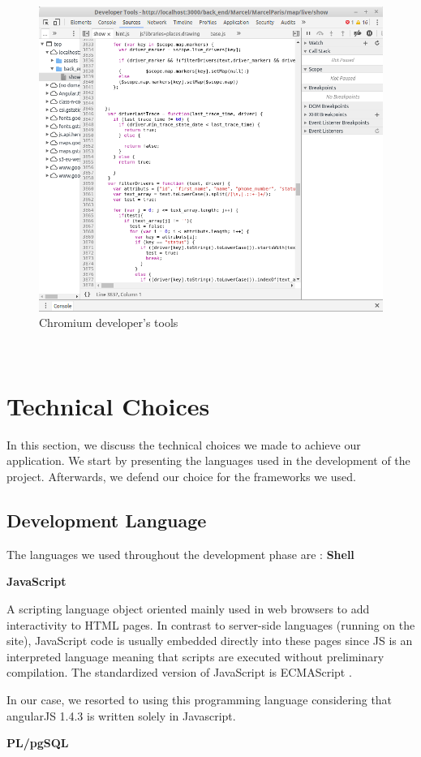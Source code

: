 \begin{itemize}[label=]
\begin{figure}[!htpb] 
\begin{center}
\includegraphics[width=6 in, height = 2 in]{images/chrome.png}
\caption{Chromium developer’s tools}
\label{chrome_dev}
\end{center}
\end{figure}~




\end{itemize}



\section {Technical Choices}
In this section, we discuss the technical choices we made to achieve our application. We start
by presenting the languages used in the development of the project. Afterwards, we defend
our choice for the frameworks we used.
\subsection{Development Language}

The languages we used throughout the development phase are :
 \textbf{Shell} 

 \textbf{JavaScript } 
 
A scripting language object oriented mainly used in web browsers to add interactivity to HTML pages. In contrast to server-side languages (running on the site), JavaScript code is usually embedded directly into these pages since JS is an interpreted language meaning that scripts are executed without preliminary compilation. The standardized version of JavaScript is ECMAScript \cite{js}.

In our case, we resorted to using this programming language considering that angularJS 1.4.3 is written solely in Javascript.

\textbf{PL/pgSQL  }

